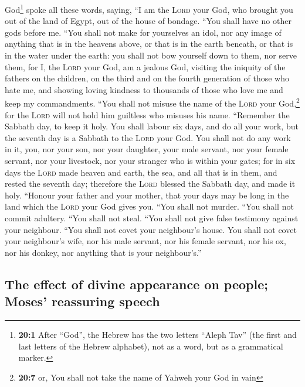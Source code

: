  God\footnote{\textbf{20:1} After ``God'', the Hebrew has
  the two letters ``Aleph Tav'' (the first and last letters of the
  Hebrew alphabet), not as a word, but as a grammatical marker.} spoke
all these words, saying,  ``I am the \textsc{Lord} your
God, who brought you out of the land of Egypt, out of the house of
bondage.  ``You shall have no other gods before me.
 ``You shall not make for yourselves an idol, nor any
image of anything that is in the heavens above, or that is in the earth
beneath, or that is in the water under the earth:  you
shall not bow yourself down to them, nor serve them, for I, the
\textsc{Lord} your God, am a jealous God, visiting the iniquity of the
fathers on the children, on the third and on the fourth generation of
those who hate me,  and showing loving kindness to
thousands of those who love me and keep my commandments. 
``You shall not misuse the name of the \textsc{Lord} your
God,\footnote{\textbf{20:7} or, You shall not take the name of Yahweh
  your God in vain} for the \textsc{Lord} will not hold him guiltless
who misuses his name.  ``Remember the Sabbath day, to keep
it holy.  You shall labour six days, and do all your work,
 but the seventh day is a Sabbath to the \textsc{Lord}
your God. You shall not do any work in it, you, nor your son, nor your
daughter, your male servant, nor your female servant, nor your
livestock, nor your stranger who is within your gates; 
for in six days the \textsc{Lord} made heaven and earth, the sea, and
all that is in them, and rested the seventh day; therefore the
\textsc{Lord} blessed the Sabbath day, and made it holy. 
``Honour your father and your mother, that your days may be long in the
land which the \textsc{Lord} your God gives you.  ``You
shall not murder.  ``You shall not commit adultery.
 ``You shall not steal.  ``You shall not
give false testimony against your neighbour.  ``You shall
not covet your neighbour's house. You shall not covet your neighbour's
wife, nor his male servant, nor his female servant, nor his ox, nor his
donkey, nor anything that is your neighbour's.''

\hypertarget{the-effect-of-divine-appearance-on-people-moses-reassuring-speech}{%
\subsection{The effect of divine appearance on people; Moses' reassuring
speech}\label{the-effect-of-divine-appearance-on-people-moses-reassuring-speech}}

